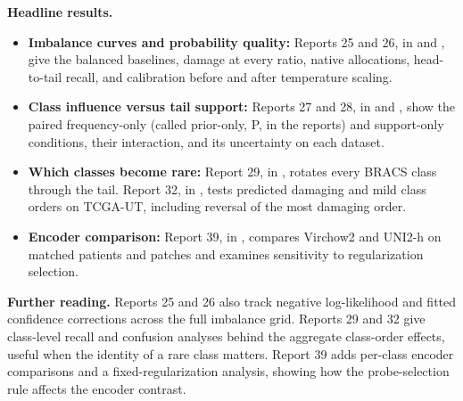 \documentclass[11pt]{article}
\begin{document}
\noindent\textbf{Headline results.}
\begin{itemize}\setlength{\itemsep}{2pt}
\item \textbf{Imbalance curves and probability quality:} Reports 25 and 26, in  and , give the balanced baselines, damage at every ratio, native allocations, head-to-tail recall, and calibration before and after temperature scaling.
\item \textbf{Class influence versus tail support:} Reports 27 and 28, in  and , show the paired frequency-only (called prior-only, P, in the reports) and support-only conditions, their interaction, and its uncertainty on each dataset.
\item \textbf{Which classes become rare:} Report 29, in , rotates every BRACS class through the tail. Report 32, in , tests predicted damaging and mild class orders on TCGA-UT, including reversal of the most damaging order.
\item \textbf{Encoder comparison:} Report 39, in , compares Virchow2 and UNI2-h on matched patients and patches and examines sensitivity to regularization selection.
\end{itemize}

\noindent\textbf{Further reading.} Reports 25 and 26 also track negative log-likelihood and fitted confidence corrections across the full imbalance grid. Reports 29 and 32 give class-level recall and confusion analyses behind the aggregate class-order effects, useful when the identity of a rare class matters. Report 39 adds per-class encoder comparisons and a fixed-regularization analysis, showing how the probe-selection rule affects the encoder contrast.

\clearpage


\end{document}
